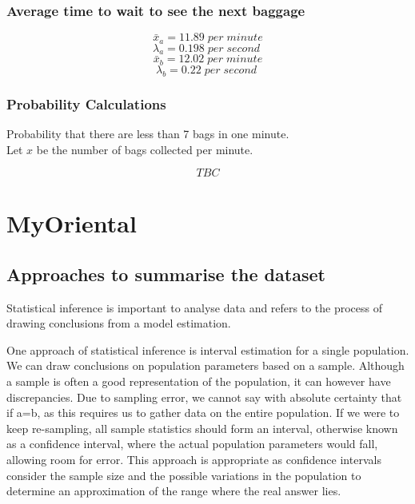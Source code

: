 \documentclass[11pt]{article}
\begin{document}
\subsubsection{Average time to wait to see the next baggage}
\begin{mdframed}
\begin{center}
\begin{equation}
\bar{x}_a = 11.89\; per\; minute
\end{equation}
\hspace{1cm}
\begin{equation}
	\lambda_a = 0.198\; per\; second\;
\end{equation}
\hspace{1cm}
\begin{equation}
\bar{x}_b = 12.02\; per\; minute
\end{equation}
\hspace{1cm}
\begin{equation}
	\lambda_b = 0.22\; per\; second\;
\end{equation}
\end{center}
\hspace{1cm}
\end{mdframed}
\subsubsection{Probability Calculations}
Probability that there are less than 7 bags in one minute.\\
Let $x$ be the number of bags collected per minute.
\begin{mdframed}
\begin{center}
\begin{equation}
TBC
\end{equation}
\hspace{1cm}
\end{center}
\end{mdframed}
\newpage
\section{MyOriental}
\subsection{Approaches to summarise the dataset}
Statistical inference is important to analyse data and refers to the process of drawing conclusions from a model estimation. 

One approach of statistical inference is interval estimation for a single population. We can draw conclusions on population parameters based on a sample. Although a sample is often a good representation of the population, it can however have discrepancies. Due to sampling error, we cannot say with absolute certainty that if a=b, as this requires us to gather data on the entire population. If we were to keep re-sampling, all sample statistics should form an interval, otherwise known as a confidence interval, where the actual population parameters would fall, allowing room for error. This approach is appropriate as confidence intervals consider the sample size and the possible variations in the population to determine an approximation of the range where the real answer lies. 
\end{document}
